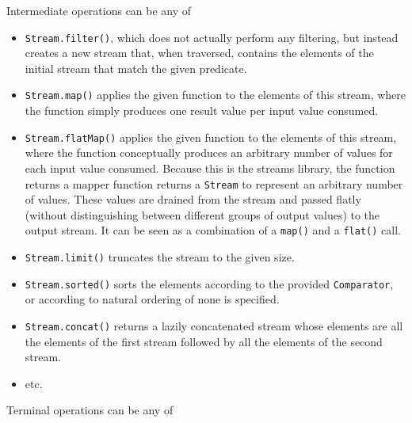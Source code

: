 \documentclass[8pt, table, xcdraw]{article}%
\begin{document}
Intermediate operations can be any of

\begin{itemize}
    \item \lstinline{Stream.filter()}, which does not actually perform any filtering, but instead creates a new stream that, when traversed, contains the elements of the initial stream that match the given predicate.
    \item \lstinline{Stream.map()} applies the given function to the elements of this stream, where the function simply produces one result value per input value consumed.
    \item \lstinline{Stream.flatMap()} applies the given function to the elements of this stream, where the function conceptually produces an arbitrary number of values for each input value consumed. Because this is the streams library, the function returns a mapper function returns a \lstinline{Stream} to represent an arbitrary number of values. These values are drained from the stream and passed flatly (without distinguishing between different groups of output values) to the output stream. It can be seen as a combination of a \lstinline{map()} and a \lstinline{flat()} call.
    \item \lstinline{Stream.limit()} truncates the stream to the given size.
    \item \lstinline{Stream.sorted()} sorts the elements according to the provided \lstinline{Comparator}, or according to natural ordering of none is specified.
    \item \lstinline{Stream.concat()} returns a lazily concatenated stream whose elements are all the elements of the first stream followed by all the elements of the second stream.
    \item etc.
\end{itemize}

Terminal operations can be any of
\end{document}
